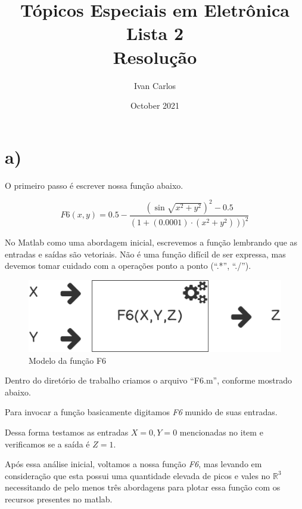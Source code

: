 \documentclass{article}
\title{%
  Tópicos Especiais em Eletrônica\\
  \large Lista 2\\
    Resolução}
\author{Ivan Carlos}
\date{October 2021}
\begin{document}
\maketitle

\section{a)}

O primeiro passo é escrever nossa função abaixo.

\begin{equation} \label{eq1}
    F6(x,y) = 0.5-\frac{(\sin\sqrt{x^2+y^2})^2 -0.5}{(1+(0.0001)\cdot (x^2+y^2)))^2}
\end{equation}

No Matlab como uma abordagem inicial, escrevemos a função lembrando que as entradas e saídas são vetoriais. Não é uma função difícil de ser expressa, mas devemos tomar cuidado com a operações ponto a ponto (``.*'', ``./''). 

\begin{figure}[h!]
\centering
\includegraphics[scale=.3]{fun.png}
\caption{Modelo da função F6}
\label{fig:func_f6_model}
\end{figure}

Dentro do diretório de trabalho criamos o arquivo ``F6.m'', conforme mostrado abaixo.



Para invocar a função basicamente digitamos \emph{F6} munido de suas entradas.

Dessa forma testamos as entradas $X=0, Y=0$ mencionadas no item e verificamos se a saída é $Z=1$.



Após essa análise inicial, voltamos a nossa função \emph{F6}, mas levando em consideração que esta possui uma quantidade elevada de picos e vales no $\mathbb{R}^3$ necessitando de pelo menos três abordagens para plotar essa função com os recursos presentes no matlab.
\end{document}
